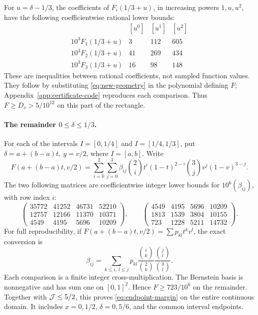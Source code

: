\documentclass[12pt]{article}
\begin{document}
For \(u=\delta-1/3\), the coefficients of \(F_i(1/3+u)\),
in increasing powers \(1,u,u^2\), have the following
coefficientwise rational lower bounds:
\[
\begin{array}{c|rrr}
 & [u^0]&[u^1]&[u^2]\\ \hline
 10^3F_1(1/3+u)&3&112&605\\
 10^3F_2(1/3+u)&41&269&434\\
 10^3F_3(1/3+u)&16&98&148
\end{array}
\]
These are inequalities between rational coefficients, not sampled
function values.  They follow by substituting
\eqref{eq:new-geometry} in the polynomial defining \(F\);
Appendix~\ref{app:certificate-code} reproduces each comparison.
Thus \(F\ge D_v>5/10^{12}\) on this part of the rectangle.

\paragraph{The remainder \(0\le\delta\le1/3\).}
For each of the intervals \(I=[0,1/4]\) and \(I=[1/4,1/3]\),
put \(\delta=a+(b-a)t,\ y=v/2\), where \(I=[a,b]\).
Write
\[
 F(a+(b-a)t,v/2)
   =\sum_{i=0}^2\sum_{j=0}^3
        \beta_{ij}\binom2i t^i(1-t)^{2-i}
                       \binom3j v^j(1-v)^{3-j}.
\]
The two following matrices are coefficientwise integer lower
bounds for \(10^6(\beta_{ij})\), with row index \(i\):
\[
 \begin{pmatrix}
 35772&41252&46731&52210\\
 12757&12166&11370&10371\\
 4549&4195&5696&10209
 \end{pmatrix},\qquad
 \begin{pmatrix}
 4549&4195&5696&10209\\
 1813&1539&3804&10155\\
 723&1228&5211&14732
 \end{pmatrix}.
\]
For full reproducibility, if
\(F(a+(b-a)t,v/2)=\sum p_{kl}t^kv^l\), the exact conversion is
\[
 \beta_{ij}=\sum_{k\le i,\ l\le j}
       p_{kl}\frac{\binom ik}{\binom2k}
                    \frac{\binom jl}{\binom3l}.
\]
Each comparison is a finite integer cross-multiplication.
The Bernstein basis is nonnegative and has sum one on
\([0,1]^2\).  Hence \(F\ge723/10^6\) on the remainder.
Together with \({\cal J}\le5/2\), this proves
\eqref{eq:endpoint-margin} on the entire continuous domain.
It includes \(x=0,1/2\), \(\delta=0,5/6\), and the common
interval endpoints.
\end{document}
